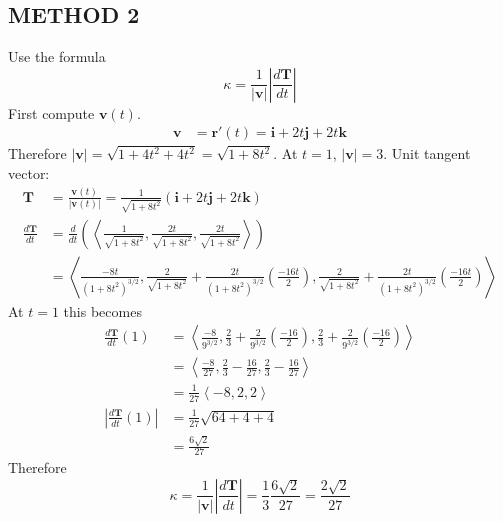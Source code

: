 {    \subsection*{METHOD 2} 
    Use the formula    
    $$\kappa = \frac{1}{|\mathbf v|}\left|\frac{d\mathbf T}{dt}\right|$$
    First compute $\mathbf v(t)$.
    \begin{align*}
        \mathbf v &= \mathbf r'(t) = \mathbf i +2t\mathbf j + 2t\mathbf k
    \end{align*}
    Therefore $|\mathbf v| = \sqrt{1+4t^2+4t^2 } = \sqrt{1+8t^2}$. At $t=1$, $|\mathbf v| = 3$. Unit tangent vector: 
    \begin{align*}
        \mathbf T &= \frac{\mathbf v(t)}{|\mathbf v(t)|} = \frac{1}{\sqrt{1+8t^2}}(\mathbf i +2t\mathbf j + 2t\mathbf k)\\
        \frac{d\mathbf T}{dt} &= \frac{d}{dt} \left( \left\langle \frac{1}{\sqrt{1+8t^2}}, \frac{2t}{\sqrt{1+8t^2}}, \frac{2t}{\sqrt{1+8t^2}}\right\rangle\right) \\
        &= \left\langle 
        \frac{-8t}{(1+8t^2)^{3/2}}, 
        \frac{2}{\sqrt{1+8t^2}} + \frac{2t}{(1+8t^2)^{3/2}}\left( \frac{-16t}2 \right), 
        \frac{2}{\sqrt{1+8t^2}} + \frac{2t}{(1+8t^2)^{3/2}}\left( \frac{-16t}2 \right)
        \right\rangle 
    \end{align*}    
    At $t=1$ this becomes
    \begin{align*}
        \frac{d\mathbf T}{dt}(1) 
        &= \left\langle 
        \frac{-8}{9^{3/2}}, 
        \frac23 + \frac{2}{9^{3/2}}\left(\frac{-16}{2}\right) , 
        \frac23 + \frac{2}{9^{3/2}}\left(\frac{-16}{2}\right) 
        \right\rangle \\
        &= \left\langle \frac{-8}{27}, \frac23 - \frac{16}{27}, \frac23 - \frac{16}{27}\right\rangle\\
        &= \frac{1}{27}\left\langle-8, 2, 2\right\rangle\\
        \left|\frac{d\mathbf T}{dt}(1) \right| &= \frac{1}{27}\sqrt{64+4+4} \\
        &= \frac{6\sqrt2}{27}
    \end{align*}        
    Therefore
    $$\kappa = \frac{1}{|\mathbf v|}\left|\frac{d\mathbf T}{dt}\right| = \frac{1}{3}\frac{6\sqrt2}{27} = \frac{2\sqrt2}{27}$$
    } 
   \else
      \vspace{6cm}
   \fi
\fi    

